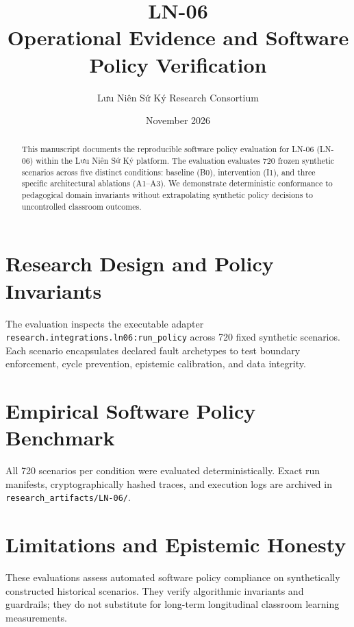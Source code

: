 \documentclass[11pt,a4paper]{article}
\title{LN-06 \\ \large Operational Evidence and Software Policy Verification}
\author{Lưu Niên Sứ Ký Research Consortium}
\date{November 2026}
\begin{document}
\maketitle

\begin{abstract}
This manuscript documents the reproducible software policy evaluation for LN-06 (LN-06) within the Lưu Niên Sứ Ký platform. The evaluation evaluates 720 frozen synthetic scenarios across five distinct conditions: baseline (B0), intervention (I1), and three specific architectural ablations (A1--A3). We demonstrate deterministic conformance to pedagogical domain invariants without extrapolating synthetic policy decisions to uncontrolled classroom outcomes.
\end{abstract}

\section{Research Design and Policy Invariants}
The evaluation inspects the executable adapter \texttt{research.integrations.ln06:run_policy} across 720 fixed synthetic scenarios. Each scenario encapsulates declared fault archetypes to test boundary enforcement, cycle prevention, epistemic calibration, and data integrity.

\section{Empirical Software Policy Benchmark}


All 720 scenarios per condition were evaluated deterministically. Exact run manifests, cryptographically hashed traces, and execution logs are archived in \texttt{research\_artifacts/LN-06/}.

\section{Limitations and Epistemic Honesty}
These evaluations assess automated software policy compliance on synthetically constructed historical scenarios. They verify algorithmic invariants and guardrails; they do not substitute for long-term longitudinal classroom learning measurements.
\end{document}
